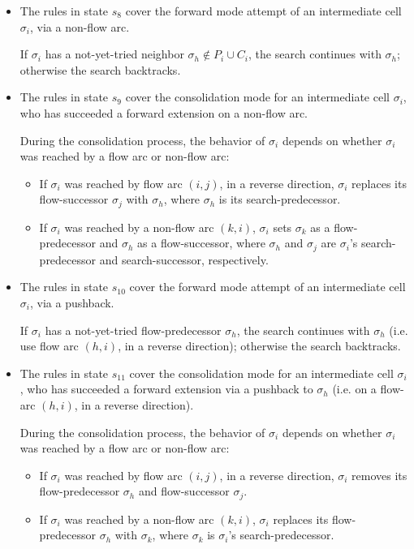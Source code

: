 \documentclass[preliminary,copyright,creativecommons]{eptcs}
\theoremstyle{remark}
\begin{document}
\begin{itemize}

\item The rules in state $s_8$ cover the 
      forward mode attempt of an intermediate cell $\sigma_i$,
      via a non-flow arc.

      If $\sigma_i$ has a not-yet-tried neighbor $\sigma_h \notin P_i \cup C_i$, 
      the search continues with $\sigma_h$;
      otherwise the search backtracks.
      

\item The rules in state $s_9$ cover the 
      consolidation mode for an intermediate cell $\sigma_i$,
      who has succeeded a forward extension on a non-flow arc.

      During the consolidation process, the behavior of $\sigma_i$ depends on 
      whether $\sigma_i$ was reached by a flow arc or non-flow arc:
      \begin{itemize}
      \item If $\sigma_i$ was reached by flow arc $(i,j)$, in a reverse direction,
            $\sigma_i$ replaces its flow-successor $\sigma_j$ with $\sigma_h$,
            where $\sigma_h$ is its search-predecessor.
      \item If $\sigma_i$ was reached by a non-flow arc $(k,i)$,
            $\sigma_i$ sets $\sigma_k$ as a flow-predecessor and 
            $\sigma_h$ as a flow-successor,
            where $\sigma_h$ and $\sigma_j$ are $\sigma_i$'s 
            search-predecessor and search-successor, respectively.
      \end{itemize}
      
\item The rules in state $s_{10}$ cover the 
      forward mode attempt of an intermediate cell $\sigma_i$,
      via a pushback.

      If $\sigma_i$ has a not-yet-tried flow-predecessor $\sigma_h$,
      the search continues with $\sigma_h$
      (i.e. use flow arc $(h,i)$, in a reverse direction);
      otherwise the search backtracks.

\item The rules in state $s_{11}$ cover the 
      consolidation mode for an intermediate cell $\sigma_i$,
      who has succeeded a forward extension via a pushback to $\sigma_h$
      (i.e. on a flow-arc $(h,i)$, in a reverse direction).

      During the consolidation process, the behavior of $\sigma_i$ depends on 
      whether $\sigma_i$ was reached by a flow arc or non-flow arc:
      \begin{itemize}
      \item If $\sigma_i$ was reached by flow arc $(i,j)$, in a reverse direction,
            $\sigma_i$ removes its flow-predecessor $\sigma_h$ and 
            flow-successor $\sigma_j$.
      \item If $\sigma_i$ was reached by a non-flow arc $(k,i)$,
            $\sigma_i$ replaces its flow-predecessor $\sigma_h$ with $\sigma_k$,
            where $\sigma_k$ is $\sigma_i$'s search-predecessor.
      \end{itemize}
\end{itemize}
\end{document}
